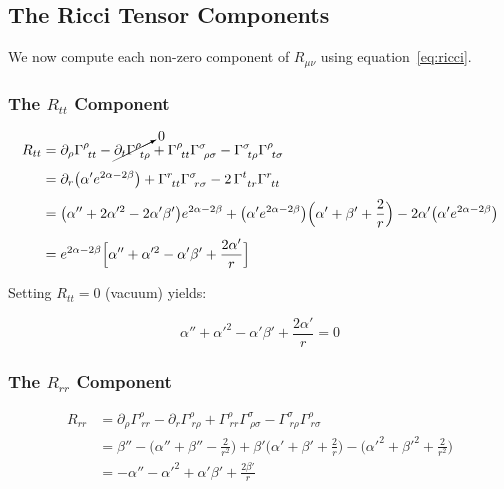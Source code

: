\documentclass[12pt]{article}
\theoremstyle{definition}
\theoremstyle{remark}
\begin{document}
\subsection{The Ricci Tensor Components}

We now compute each non-zero component of $R_{\mu\nu}$ using equation~\eqref{eq:ricci}.

\subsubsection{The \texorpdfstring{$R_{tt}$}{R\_tt} Component}

\begin{align}
  R_{tt} &= \partial_{\rho}\Gamma^{\rho}_{\ tt} - \cancelto{0}{\partial_{t}\Gamma^{\rho}_{\ t\rho}}
           + \Gamma^{\rho}_{\ tt}\Gamma^{\sigma}_{\ \rho\sigma}
           - \Gamma^{\sigma}_{\ t\rho}\Gamma^{\rho}_{\ t\sigma} \\[4pt]
  &= \partial_{r}\big(\alpha' e^{2\alpha-2\beta}\big)
     + \Gamma^{r}_{\ tt}\Gamma^{\sigma}_{\ r\sigma}
     - 2\,\Gamma^{t}_{\ tr}\Gamma^{r}_{\ tt} \\[4pt]
  &= \big(\alpha'' + 2\alpha'^{2} - 2\alpha'\beta'\big)e^{2\alpha-2\beta}
     + \big(\alpha' e^{2\alpha-2\beta}\big)\Big(\alpha' + \beta' + \frac{2}{r}\Big)
     - 2\alpha'\big(\alpha' e^{2\alpha-2\beta}\big) \\[4pt]
  &= e^{2\alpha-2\beta}\Big[\alpha'' + \alpha'^{2} - \alpha'\beta' + \frac{2\alpha'}{r}\Big]
\end{align}

Setting $R_{tt} = 0$ (vacuum) yields:

\begin{equation}\label{eq:Rtt-zero}
  \boxed{\;\alpha'' + \alpha'^{2} - \alpha'\beta' + \frac{2\alpha'}{r} = 0\;}
\end{equation}

\subsubsection{The \texorpdfstring{$R_{rr}$}{R\_rr} Component}

\begin{align}
  R_{rr} &= \partial_{\rho}\Gamma^{\rho}_{\ rr} - \partial_{r}\Gamma^{\rho}_{\ r\rho}
           + \Gamma^{\rho}_{\ rr}\Gamma^{\sigma}_{\ \rho\sigma}
           - \Gamma^{\sigma}_{\ r\rho}\Gamma^{\rho}_{\ r\sigma} \\[4pt]
  &= \beta'' - \Big(\alpha'' + \beta'' - \frac{2}{r^{2}}\Big)
     + \beta'\Big(\alpha' + \beta' + \frac{2}{r}\Big)
     - \Big(\alpha'^{2} + \beta'^{2} + \frac{2}{r^{2}}\Big) \\[4pt]
  &= -\alpha'' - \alpha'^{2} + \alpha'\beta' + \frac{2\beta'}{r}
\end{align}
\end{document}
